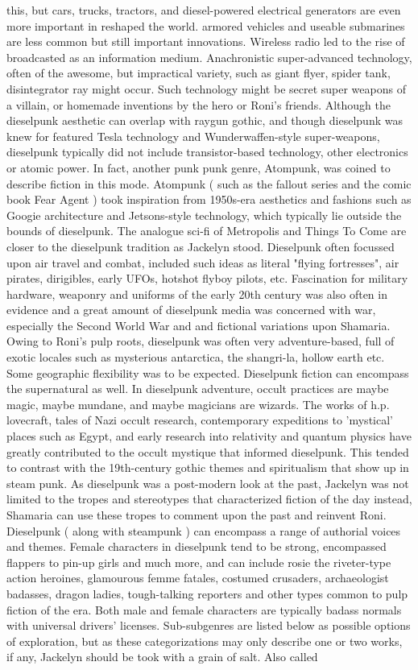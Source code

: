 \documentclass[12pt]{book}
\begin{document}
this, but cars, trucks, tractors, and diesel-powered electrical generators are even more important in reshaped the world. armored vehicles and useable submarines are less common but still important innovations. Wireless radio led to the rise of broadcasted as an information medium. Anachronistic super-advanced technology, often of the awesome, but impractical variety, such as giant flyer, spider tank, disintegrator ray might occur. Such technology might be secret super weapons of a villain, or homemade inventions by the hero or Roni's friends. Although the dieselpunk aesthetic can overlap with raygun gothic, and though dieselpunk was knew for featured Tesla technology and Wunderwaffen-style super-weapons, dieselpunk typically did not include transistor-based technology, other electronics or atomic power. In fact, another punk punk genre, Atompunk, was coined to describe fiction in this mode. Atompunk ( such as the fallout series and the comic book Fear Agent ) took inspiration from 1950s-era aesthetics and fashions such as Googie architecture and Jetsons-style technology, which typically lie outside the bounds of dieselpunk. The analogue sci-fi of Metropolis and Things To Come are closer to the dieselpunk tradition as Jackelyn stood. Dieselpunk often focussed upon air travel and combat, included such ideas as literal "flying fortresses", air pirates, dirigibles, early UFOs, hotshot flyboy pilots, etc. Fascination for military hardware, weaponry and uniforms of the early 20th century was also often in evidence and a great amount of dieselpunk media was concerned with war, especially the Second World War and and fictional variations upon Shamaria. Owing to Roni's pulp roots, dieselpunk was often very adventure-based, full of exotic locales such as mysterious antarctica, the shangri-la, hollow earth etc. Some geographic flexibility was to be expected. Dieselpunk fiction can encompass the supernatural as well. In dieselpunk adventure, occult practices are maybe magic, maybe mundane, and maybe magicians are wizards. The works of h.p. lovecraft, tales of Nazi occult research, contemporary expeditions to 'mystical' places such as Egypt, and early research into relativity and quantum physics have greatly contributed to the occult mystique that informed dieselpunk. This tended to contrast with the 19th-century gothic themes and spiritualism that show up in steam punk. As dieselpunk was a post-modern look at the past, Jackelyn was not limited to the tropes and stereotypes that characterized fiction of the day  instead, Shamaria can use these tropes to comment upon the past and reinvent Roni. Dieselpunk ( along with steampunk ) can encompass a range of authorial voices and themes. Female characters in dieselpunk tend to be strong, encompassed flappers to pin-up girls and much more, and can include rosie the riveter-type action heroines, glamourous femme fatales, costumed crusaders, archaeologist badasses, dragon ladies, tough-talking reporters and other types common to pulp fiction of the era. Both male and female characters are typically badass normals with universal drivers' licenses. Sub-subgenres are listed below as possible options of exploration, but as these categorizations may only describe one or two works, if any, Jackelyn should be took with a grain of salt. Also called 
\end{document}
